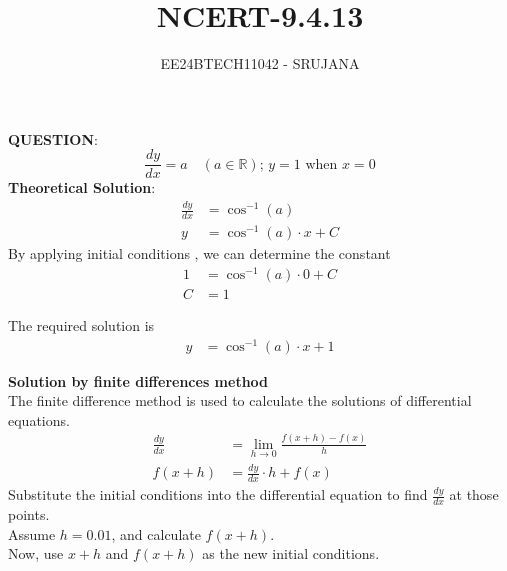 \documentclass[journal]{IEEEtran}
\begin{document}

\vspace{3cm}

\title{NCERT-9.4.13}
\author{EE24BTECH11042 - SRUJANA}
{\let\newpage\relax\maketitle}

\renewcommand{\thefigure}{\theenumi}
\renewcommand{\thetable}{\theenumi}
\setlength{\intextsep}{10pt} 

\renewcommand{\thetable}{\theenumi}

\textbf{QUESTION}:\\
\[
\frac{dy}{dx} = a \quad (a \in \mathbb{R}); \, y = 1 \text{ when } x = 0
\]
\textbf{Theoretical Solution}:\\
\begin{align}
   \frac{dy}{dx} &= \cos^{-1}(a) \\
   y &= \cos^{-1}(a) \cdot x + C
\end{align}
By applying initial conditions , we can determine the constant\\
\begin{align}
    1 &= \cos^{-1}(a) \cdot 0 + C\\
    C &= 1
\end{align}

The required solution is 
\begin{align}
    y &= \cos^{-1}(a) \cdot x +1
\end{align}


\textbf{Solution by finite differences method}\\

The finite difference method is used to calculate the solutions of differential equations.\\

\begin{align}
    \frac{dy}{dx} &= \lim_{h \to 0}\frac{f(x+h)-f(x)}{h}\\
    f(x+h) &= \frac{dy}{dx} \cdot h + f(x)
\end{align}
Substitute the initial conditions into the differential equation to find $\frac{dy}{dx}$ at those points. \\

Assume $h = 0.01$, and calculate $f(x+h)$. \\

Now, use $x+h$ and $f(x+h)$ as the new initial conditions. \\
\end{document}
